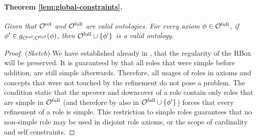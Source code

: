\documentclass[
]{ceurart}
\newtheorem{theorem}{Theorem}
\begin{document}
\paragraph{Theorem \ref{lem:global-constraints}.}
{\it
Given that ${\mathcal{O}^\textnormal{ref}}$ and ${\mathcal{O}^\textnormal{full}}$ are valid \SROIQ ontologies. For every axiom $\phi \in {\mathcal{O}^\textnormal{full}}$, if $\phi' \in g_{{\mathcal{O}^\textnormal{ref}},{\mathcal{O}^\textnormal{full}}}(\phi)$, then ${\mathcal{O}^\textnormal{full}} \cup \{ \phi' \}$ is a valid \SROIQ ontology.
}

\begin{proof}(\emph{Sketch})
  We have established already in , that the regularity of the RBox will be preserved.
  It is guaranteed by  that all roles that were simple before addition, are still simple afterwards. Therefore, all usages of roles in axioms and concepts that were not touched by the refinement do not pose a problem. The condition static that the upcover and downcover of a role contain only roles that are simple in ${\mathcal{O}^\textnormal{full}}$ (and therefore by  also in ${\mathcal{O}^\textnormal{full}} \cup \{ \phi' \}$) forces that every refinement of a role is simple. This restriction to simple roles guarantees that no non-simple role may be used in disjoint role axioms, or the scope of cardinality and self constraints.
\end{proof}
\end{document}
